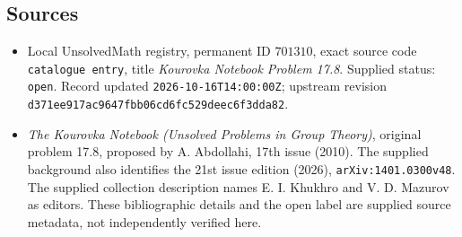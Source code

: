 \documentclass[11pt]{article}
\begin{document}
\subsection{Sources}
\begin{itemize}
\item Local UnsolvedMath registry, permanent ID \(701310\), exact source code \texttt{catalogue entry}, title \emph{Kourovka Notebook Problem 17.8}. Supplied status: \texttt{open}. Record updated \texttt{2026-10-16T14:00:00Z}; upstream revision \texttt{d371ee917ac9647fbb06cd6fc529deec6f3dda82}.
\item \emph{The Kourovka Notebook (Unsolved Problems in Group Theory)}, original problem 17.8, proposed by A. Abdollahi, 17th issue (2010). The supplied background also identifies the 21st issue edition (2026), \texttt{arXiv:1401.0300v48}. The supplied collection description names E. I. Khukhro and V. D. Mazurov as editors. These bibliographic details and the open label are supplied source metadata, not independently verified here.
\end{itemize}
\end{document}
